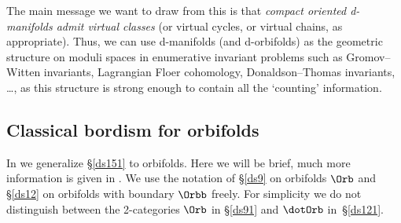 \documentclass{article}
\begin{document}
The main message we want to draw from this is that {\it compact
oriented d-manifolds admit virtual classes\/} (or
virtual cycles, or virtual chains, as appropriate). Thus, we can use
d-manifolds (and d-orbifolds) as the geometric structure on moduli
spaces in enumerative invariant problems such as
Gromov--Witten invariants, Lagrangian
Floer cohomology, Donaldson--Thomas
invariants, \ldots, as this
structure is strong enough to contain all the `counting'
information.

\subsection{Classical bordism for orbifolds}
\label{ds153}

In \cite[\S 13.3]{Joyc6} we generalize \S\ref{ds151} to orbifolds.
Here we will be brief, much more information is given in \cite[\S
13.3]{Joyc6}. We use the notation of \S\ref{ds9} on orbifolds $\Orb$
and \S\ref{ds12} on orbifolds with boundary $\Orbb$ freely. For
simplicity we do not distinguish between the 2-categories $\Orb$ in
\S\ref{ds91} and $\dotOrb$ in~\S\ref{ds121}.
\end{document}

